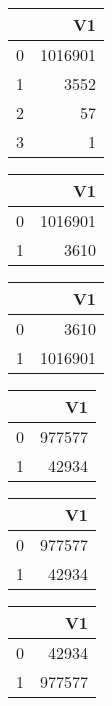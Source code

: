 \bigskip\bigskip
\centering
\begin{tabular}{rr}
  \hline
 & V1 \\ 
  \hline
0 & 1016901 \\ 
  1 & 3552 \\ 
  2 &  57 \\ 
  3 &   1 \\ 
   \hline
\end{tabular}

\bigskip\bigskip
\centering
\begin{tabular}{rr}
  \hline
 & V1 \\ 
  \hline
0 & 1016901 \\ 
  1 & 3610 \\ 
   \hline
\end{tabular}

\bigskip\bigskip
\centering
\begin{tabular}{rr}
  \hline
 & V1 \\ 
  \hline
0 & 3610 \\ 
  1 & 1016901 \\ 
   \hline
\end{tabular}

\bigskip\bigskip
\centering
\begin{tabular}{rr}
  \hline
 & V1 \\ 
  \hline
0 & 977577 \\ 
  1 & 42934 \\ 
   \hline
\end{tabular}

\bigskip\bigskip
\centering
\begin{tabular}{rr}
  \hline
 & V1 \\ 
  \hline
0 & 977577 \\ 
  1 & 42934 \\ 
   \hline
\end{tabular}

\bigskip\bigskip
\centering
\begin{tabular}{rr}
  \hline
 & V1 \\ 
  \hline
0 & 42934 \\ 
  1 & 977577 \\ 
   \hline
\end{tabular}

